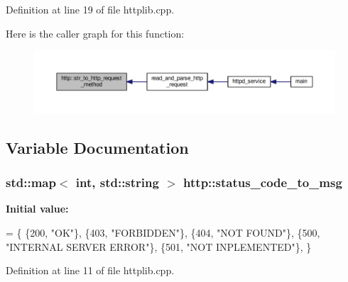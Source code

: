 Definition at line 19 of file httplib.\+cpp.



Here is the caller graph for this function\+:\nopagebreak
\begin{figure}[H]
\begin{center}
\leavevmode
\includegraphics[width=350pt]{namespacehttp_a5ba1900a0d4aac4aef53ca5a7bcdd025_icgraph}
\end{center}
\end{figure}




\subsection{Variable Documentation}
\subsubsection[{\texorpdfstring{status\+\_\+code\+\_\+to\+\_\+msg}{status_code_to_msg}}]{\setlength{\rightskip}{0pt plus 5cm}std\+::map$<$ int, std\+::string $>$ http\+::status\+\_\+code\+\_\+to\+\_\+msg}\hypertarget{namespacehttp_a732419ee002952aab275c7f35b7387ff}{}\label{namespacehttp_a732419ee002952aab275c7f35b7387ff}
{\bfseries Initial value\+:}
\begin{DoxyCode}
= \{
        \{200, \textcolor{stringliteral}{"OK"}\},
        \{403, \textcolor{stringliteral}{"FORBIDDEN"}\},
        \{404, \textcolor{stringliteral}{"NOT FOUND"}\},
        \{500, \textcolor{stringliteral}{"INTERNAL SERVER ERROR"}\},
        \{501, \textcolor{stringliteral}{"NOT INPLEMENTED"}\},
    \}
\end{DoxyCode}


Definition at line 11 of file httplib.\+cpp.

